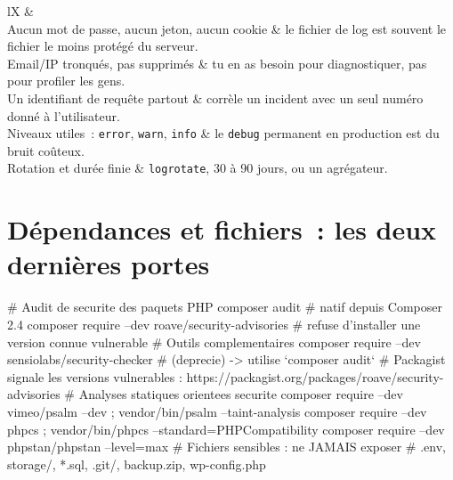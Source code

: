 \begin{tabz}{lX}
  \headrow {} \&  \\
  \midrule
  Aucun mot de passe, aucun jeton, aucun cookie \& le fichier de log est souvent le fichier le moins prot\'eg\'e du serveur. \\
  Email/IP tronqu\'es, pas supprim\'es \& tu en as besoin pour diagnostiquer, pas pour profiler les gens. \\
  Un identifiant de requ\^ete partout \& corr\`ele un incident avec un seul num\'ero donn\'e \`a l'utilisateur. \\
  Niveaux utiles~: \verb|error|, \verb|warn|, \verb|info| \& le \verb|debug| permanent en production est du bruit co\^uteux. \\
  Rotation et dur\'ee finie \& \verb|logrotate|, 30 \`a 90 jours, ou un agr\'egateur. \\
\end{tabz}

\section{D\'ependances et fichiers~: les deux derni\`eres portes}

\begin{terminal}
# Audit de securite des paquets PHP
composer audit                                  # natif depuis Composer 2.4
composer require --dev roave/security-advisories  # refuse d'installer une version connue vulnerable
# Outils complementaires
composer require --dev sensiolabs/security-checker   # (deprecie) -> utilise `composer audit`
# Packagist signale les versions vulnerables : https://packagist.org/packages/roave/security-advisories
# Analyses statiques orientees securite
composer require --dev vimeo/psalm --dev ; vendor/bin/psalm --taint-analysis
composer require --dev phpcs ; vendor/bin/phpcs --standard=PHPCompatibility
composer require --dev phpstan/phpstan --level=max
# Fichiers sensibles : ne JAMAIS exposer
#   .env, storage/, *.sql, .git/, backup.zip, wp-config.php~
\end{terminal}


